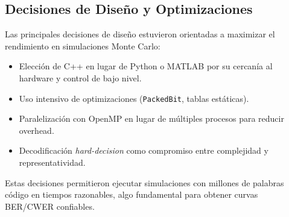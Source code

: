 \subsection{Decisiones de Diseño y Optimizaciones}

Las principales decisiones de diseño estuvieron orientadas a maximizar el rendimiento en simulaciones Monte Carlo:

\begin{itemize}
    \item Elección de C++ en lugar de Python o MATLAB por su cercanía al hardware y control de bajo nivel.
        \item Uso intensivo de optimizaciones (\texttt{PackedBit}, tablas estáticas).
    \item Paralelización con OpenMP en lugar de múltiples procesos para reducir overhead.
    \item Decodificación \textit{hard-decision} como compromiso entre complejidad y representatividad.
\end{itemize}

Estas decisiones permitieron ejecutar simulaciones con millones de palabras código en tiempos razonables, algo fundamental para obtener curvas BER/CWER confiables.